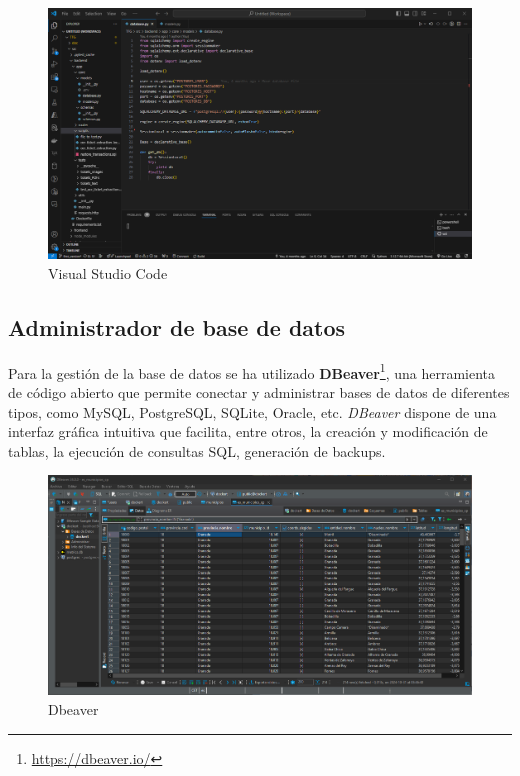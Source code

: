 \begin{figure}[ht!]
    \centering
    \includegraphics[width=\linewidth]{imagenes/visual_studio_code.png}
    \caption{Visual Studio Code}
    \label{fig:visual_studio_code}
\end{figure}

\subsection{Administrador de base de datos}
Para la gestión de la base de datos se ha utilizado \textbf{DBeaver}\footnote{\url{https://dbeaver.io/}}, una herramienta de código abierto que permite conectar y administrar bases de datos de diferentes tipos, como MySQL, PostgreSQL, SQLite, Oracle, etc. \textit{DBeaver} dispone de una interfaz gráfica intuitiva que facilita, entre otros, la creación y modificación de tablas, la ejecución de consultas SQL, generación de backups.

\begin{figure}[ht!]
    \centering
    \includegraphics[width=\linewidth]{imagenes/dbeaver.png}
    \caption{Dbeaver}
    \label{fig:dbeaver}
\end{figure}

